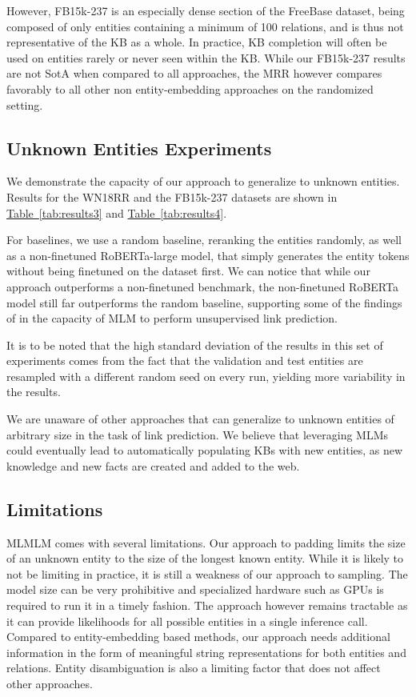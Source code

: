 \documentclass[11pt,a4paper]{article}
\newcommand{\CiteT}[1]{\citet{#1}} \newcommand{\CiteP}[1]{~\citep{#1}} \newcommand{\CodeT}[1]{\texttt{#1}}
\newcommand{\RefTable}[1]{\hyperref[#1]{Table~\ref{#1}}}
\begin{document}
However, FB15k-237 is an especially dense section of the FreeBase dataset, being composed of only entities containing a minimum of 100 relations, and is thus not representative of the KB as a whole.
In practice, KB completion will often be used on entities rarely or never seen within the KB.
While our FB15k-237 results are not SotA when compared to all approaches, the MRR however compares favorably to all other non entity-embedding approaches on the randomized setting.

\subsection{Unknown Entities Experiments}
We demonstrate the capacity of our approach to generalize to unknown entities.
Results for the WN18RR and the FB15k-237 datasets are shown in \RefTable{tab:results3} and \RefTable{tab:results4}.

For baselines, we use a random baseline, reranking the entities randomly, as well as a non-finetuned RoBERTa-large model, that simply generates the entity tokens without being finetuned on the dataset first.
We can notice that while our approach outperforms a non-finetuned benchmark, the non-finetuned RoBERTa model still far outperforms the random baseline, supporting some of the findings of \CiteT{LMKB} in the capacity of MLM to perform unsupervised link prediction.

It is to be noted that the high standard deviation of the results in this set of experiments comes from the fact that the validation and test entities are resampled with a different random seed on every run, yielding more variability in the results.

We are unaware of other approaches that can generalize to unknown entities of arbitrary size in the task of link prediction.
We believe that leveraging MLMs could eventually lead to automatically populating KBs with new entities, as new knowledge and new facts are created and added to the web.

\subsection{Limitations}
MLMLM comes with several limitations.
Our approach to padding limits the size of an unknown entity to the size of the longest known entity. 
While it is likely to not be limiting in practice, it is still a weakness of our approach to sampling.
The model size can be very prohibitive and specialized hardware such as GPUs is required to run it in a timely fashion.
The approach however remains tractable as it can provide likelihoods for all possible entities in a single inference call.
Compared to entity-embedding based methods, our approach needs additional information in the form of meaningful string representations for both entities and relations.
Entity disambiguation is also a limiting factor that does not affect other approaches. 
\end{document}
